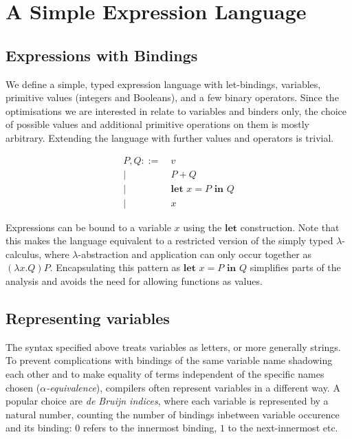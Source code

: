 \documentclass[11pt,a4paper]{article}
\begin{document}
\section{A Simple Expression Language}

\subsection{Expressions with Bindings}

We define a simple, typed expression language with let-bindings,
variables, primitive values (integers and Booleans), and a few binary operators.
Since the optimisations we are interested in relate to variables and binders only,
the choice of possible values and additional primitive operations on them is mostly arbitrary.
Extending the language with further values and operators is trivial.

\begin{align*}
  P, Q ::=&\ v
  \\ \big|&\ P + Q
  \\ \big|&\ \textbf{let } x = P \textbf{ in } Q
  \\ \big|&\ x
\end{align*}

Expressions can be bound to a variable $x$ using the $\textbf{let}$ construction.
Note that this makes the language equivalent to a restricted version of the simply typed $\lambda$-calculus,
where $\lambda$-abstraction and application can only occur together as $(\lambda x. Q) P$.
Encapsulating this pattern as $\textbf{let } x = P \textbf{ in } Q$
simplifies parts of the analysis and
avoids the need for allowing functions as values.



\subsection{Representing variables}

The syntax specified above treats variables as letters, or more generally strings.
To prevent complications with bindings of the same variable name shadowing each other
and to make equality of terms independent of the specific names chosen
(\emph{$\alpha$-equivalence}),
compilers often represent variables in a different way.
A popular choice are \emph{de Bruijn indices},
where each variable is represented by a natural number,
counting the number of bindings inbetween variable occurence and its binding:
$0$ refers to the innermost binding, $1$ to the next-innermost etc.
\end{document}
